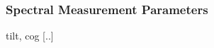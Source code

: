 \documentclass[11pt]{article}
\begin{document}
\subsubsection*{Spectral Measurement Parameters}
tilt, cog
[..]
%
%
%
%
%
%	
%	
\end{document}

